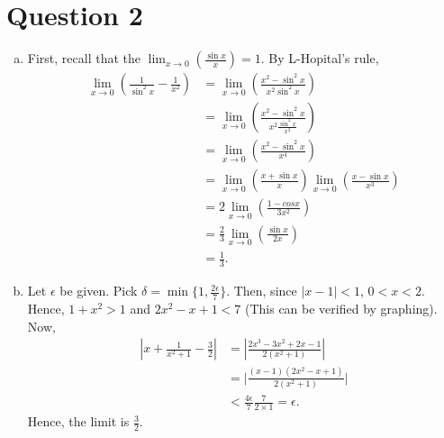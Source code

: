 \documentclass[12pt,a4paper]{article}
\begin{document}
	\section*{Question 2}
	\begin{enumerate}[a.]
	    \item First, recall that the 
	   $\lim_{x \rightarrow 0} \left( \frac{\sin{x}}{x} \right) = 1 $. By L-Hopital's rule,
	    \begin{align*}
	   \lim_{x \rightarrow 0} \left( \frac{1}{\sin^2{x}}-\frac{1}{x^2} \right) &= \lim_{x \rightarrow 0} \left( \frac{x^2-\sin^2{x}}{x^2 \sin^2{x}} \right) \\
	   &= \lim_{x \rightarrow 0} \left( \frac{x^2-\sin^2{x}}{x^2 \frac{\sin^2{x}}{x^2}} \right) \\
	   &= \lim_{x \rightarrow 0} \left( \frac{x^2-\sin^2{x}}{x^4} \right) \\
	   &=\lim_{x \rightarrow 0} \left( \frac{x+\sin{x}}{x} \right) \lim_{x \rightarrow 0} \left( \frac{x-\sin{x}}{x^3} \right) \\
	   &= 2\lim_{x \rightarrow 0} \left( \frac{1-cos{x}}{3x^2} \right) \\
	   &= \frac{2}{3} \lim_{x \rightarrow 0} \left( \frac{\sin{x}}{2x} \right) \\
	   &= \frac{1}{3}.
	    \end{align*}
	    \item Let $\epsilon$ be given. Pick $\delta = \min\{1,\frac{2\epsilon}{7}\}$. Then, since $|x-1| < 1$, $0<x<2$. Hence, $1+x^2>1$ and $2x^2-x+1 < 7$ (This can be verified by graphing). Now, 
	    \begin{align*}
	        \left | x+\frac{1}{x^2+1}-\frac{3}{2} \right | &= \left | \frac{2x^3-3x^2+2x-1}{2(x^2+1)} \right| \\ 
	        &= \lvert \frac{(x-1)(2x^2-x+1)}{2(x^2+1)}\rvert \\
	        &< \frac{4\epsilon}{7} \frac{7}{2 \times 1} = \epsilon.
	    \end{align*}
	    Hence, the limit is $\frac{3}{2}$.
	\end{enumerate}
	
	
\end{document}
